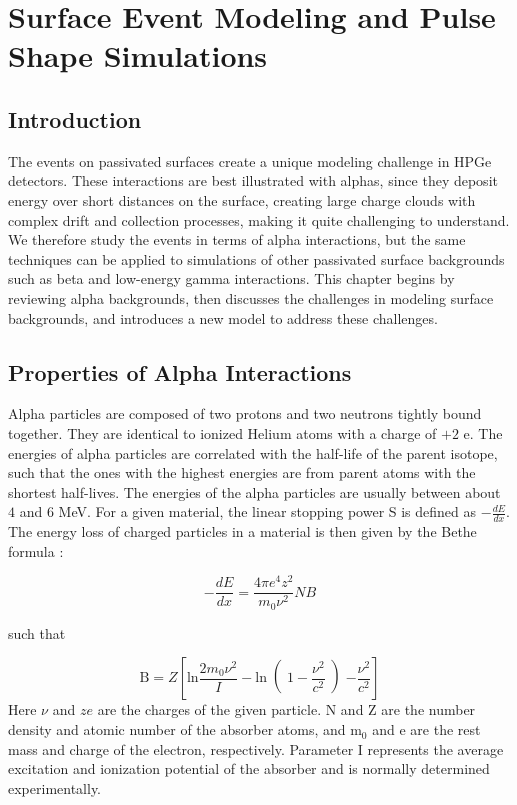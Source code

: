 \chapter{Surface Event Modeling and Pulse Shape Simulations}

\section{Introduction}
The events on passivated surfaces create a unique modeling challenge in HPGe detectors. These interactions are best illustrated with alphas, since they deposit energy over short distances on the surface, creating large charge clouds with complex drift and collection processes, making it quite challenging to understand. We therefore study the events in terms of alpha interactions, but the same techniques can be applied to simulations of other passivated surface backgrounds such as beta and low-energy gamma interactions. This chapter begins by reviewing alpha backgrounds, then discusses the challenges in modeling surface backgrounds, and introduces a new model to address these challenges.


\section{Properties of Alpha Interactions}
Alpha particles are composed of two protons and two neutrons tightly bound together. They are identical to ionized Helium atoms with a charge of $+2$ e. The energies of alpha particles are correlated with the half-life of the parent isotope, such that the ones with the highest energies are from parent atoms with the shortest half-lives. The energies of the alpha particles are usually between about $4$ and $6$ MeV. For a given material, the linear stopping power S is defined as $-\frac{dE}{dx}$. The energy loss of charged particles in a material is then given by the Bethe formula \cite{Bethe1953}:

\begin{equation}\label{bethe_formula}
    -\frac{dE}{dx} = \frac{4\pi e^4z^2}{m_0\nu^2}NB
\end{equation}

\noindent
such that

\begin{equation}\label{bethe_B}
    \text{B}=Z\left[ \text{ln}\frac{2m_0\nu^2}{I}-\text{ln}\right(1-\frac{\nu^2}{c^2}\left)-\frac{\nu^2}{c^2}\right]
\end{equation}
\noindent
Here $\nu$ and $ze$ are the charges of the given particle. N and Z are the number density and atomic number of the absorber atoms, and m$_0$ and e are the rest mass and charge of the electron, respectively. Parameter I represents the average excitation and ionization potential of the absorber and is normally determined experimentally. 

